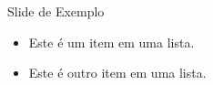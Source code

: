 \documentclass{beamer}
\begin{document}
\begin{frame}{Slide de Exemplo}
    \begin{itemize}
        \item Este é um item em uma lista.
        \item Este é outro item em uma lista.
    \end{itemize}
\end{frame}
\end{document}
